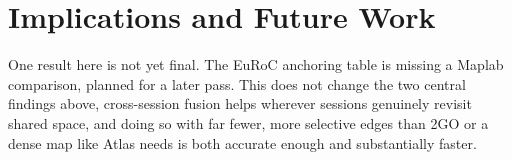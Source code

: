 \section{Implications and Future Work}
\label{sec:discussion-future}

One result here is not yet final. The EuRoC anchoring table is missing a Maplab comparison,
planned for a later pass. This does not change the two central findings above, cross-session
fusion helps wherever sessions genuinely revisit shared space, and doing so with far fewer, more
selective edges than 2GO or a dense map like Atlas needs is both accurate enough and substantially
faster.
